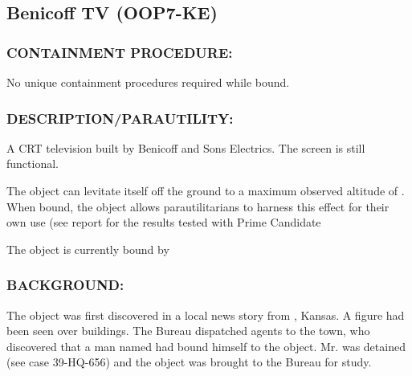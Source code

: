 \subsection*{Benicoff TV (OOP7-KE)
}
\subsubsection*{CONTAINMENT PROCEDURE:
}
\par No unique containment procedures
required while bound.
\subsubsection*{DESCRIPTION/PARAUTILITY:}
\par A CRT television built by Benicoff and
Sons Electrics. The screen is still
functional.
\par The object can levitate itself off the ground to a maximum
observed altitude of . When bound, the object allows
parautilitarians to harness this effect for their own use (see report 
for the results tested with Prime Candidate 
\par The object is currently bound by 
\subsubsection*{BACKGROUND:}
\par The object was first discovered in a local news story from 
, Kansas. A figure had been seen  over
buildings. The Bureau dispatched agents to the town, who
discovered that a man named  had bound
himself to the object. Mr.  was detained (see case
39-HQ-656) and the object was brought to the Bureau for study.